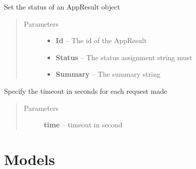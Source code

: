 \documentclass[letterpaper,10pt,english]{sphinxmanual}
\begin{document}
\begin{fulllineitems}
\begin{fulllineitems}
\end{fulllineitems}


\begin{fulllineitems}
\label{Available modules:BaseSpacePy.api.BaseSpaceAPI.BaseSpaceAPI.setAppSessionState}
Set the status of an AppResult object
\begin{quote}\begin{description}
\item[{Parameters}] \leavevmode\begin{itemize}
\item {} 
\textbf{Id} -- The id of the AppResult

\item {} 
\textbf{Status} -- The status assignment string must

\item {} 
\textbf{Summary} -- The summary string

\end{itemize}

\end{description}\end{quote}

\end{fulllineitems}


\begin{fulllineitems}
\label{Available modules:BaseSpacePy.api.BaseSpaceAPI.BaseSpaceAPI.setTimeout}
Specify the timeout in seconds for each request made
\begin{quote}\begin{description}
\item[{Parameters}] \leavevmode
\textbf{time} -- timeout in second

\end{description}\end{quote}

\end{fulllineitems}


\end{fulllineitems}



\section{Models}
\label{Available modules:models}
\end{document}
